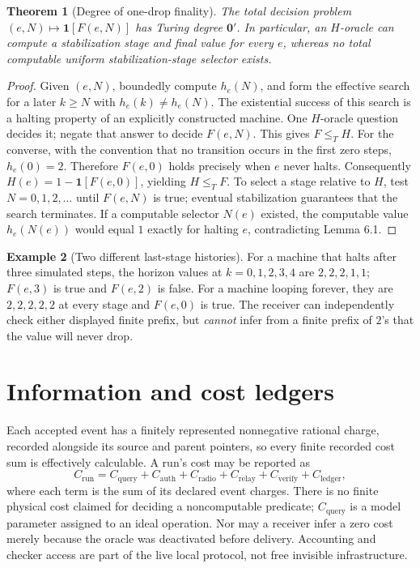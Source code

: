 \documentclass[11pt,letterpaper]{article}
\newtheorem{theorem}{Theorem}[section]\newtheorem{lemma}[theorem]{Lemma}\newtheorem{proposition}[theorem]{Proposition}\newtheorem{corollary}[theorem]{Corollary}\theoremstyle{definition}\newtheorem{definition}[theorem]{Definition}\newtheorem{example}[theorem]{Example}\newtheorem{remark}[theorem]{Remark}\newtheorem{conjecture}[theorem]{Conjecture}
\begin{document}
\begin{theorem}[Degree of one-drop finality]
The total decision problem $(e,N)\mapsto\mathbf 1[F(e,N)]$ has Turing degree $\mathbf 0'$. In particular, an $H$-oracle can compute a stabilization stage and final value for every $e$, whereas no total computable uniform stabilization-stage selector exists.
\end{theorem}
\begin{proof}
Given $(e,N)$, boundedly compute $h_e(N)$, and form the effective search for a later $k\ge N$ with $h_e(k)\ne h_e(N)$. The existential success of this search is a halting property of an explicitly constructed machine. One $H$-oracle question decides it; negate that answer to decide $F(e,N)$. This gives $F\le_T H$. For the converse, with the convention that no transition occurs in the first zero steps, $h_e(0)=2$. Therefore $F(e,0)$ holds precisely when $e$ never halts. Consequently $H(e)=1-\mathbf 1[F(e,0)]$, yielding $H\le_T F$. To select a stage relative to $H$, test $N=0,1,2,\ldots$ until $F(e,N)$ is true; eventual stabilization guarantees that the search terminates. If a computable selector $N(e)$ existed, the computable value $h_e(N(e))$ would equal $1$ exactly for halting $e$, contradicting Lemma 6.1.
\end{proof}
\begin{example}[Two different last-stage histories]
For a machine that halts after three simulated steps, the horizon values at $k=0,1,2,3,4$ are $2,2,2,1,1$; $F(e,3)$ is true and $F(e,2)$ is false. For a machine looping forever, they are $2,2,2,2,2$ at every stage and $F(e,0)$ is true. The receiver can independently check either displayed finite prefix, but \emph{cannot} infer from a finite prefix of $2$'s that the value will never drop.
\end{example}

\section{Information and cost ledgers}
Each accepted event has a finitely represented nonnegative rational charge, recorded alongside its source and parent pointers, so every finite recorded cost sum is effectively calculable. A run's cost may be reported as
\[
C_{\mathrm{run}}=C_{\mathrm{query}}+C_{\mathrm{auth}}+C_{\mathrm{radio}}+C_{\mathrm{relay}}+C_{\mathrm{verify}}+C_{\mathrm{ledger}},
\]
where each term is the sum of its declared event charges. There is no finite physical cost claimed for deciding a noncomputable predicate; $C_{\mathrm{query}}$ is a model parameter assigned to an ideal operation. Nor may a receiver infer a zero cost merely because the oracle was deactivated before delivery. Accounting and checker access are part of the live local protocol, not free invisible infrastructure.
\end{document}
